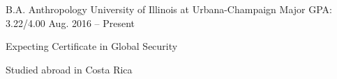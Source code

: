 

\begin{cventries}

  \cventry
    {B.A. Anthropology} %
    {University of Illinois at Urbana-Champaign} %
    {Major GPA: 3.22/4{\tiny{.00}}} %
    {Aug. 2016 -- Present} %
    {
      \begin{cvitems} %
        \item {Expecting Certificate in Global Security}
        \item {Studied abroad in Costa Rica}
      \end{cvitems}
    }

\end{cventries}
